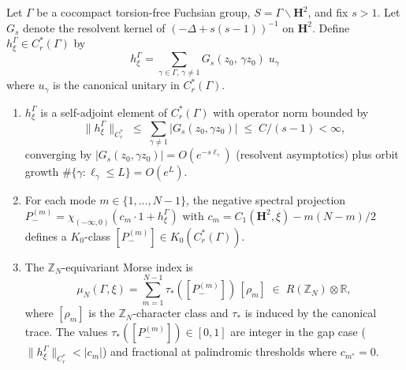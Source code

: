 \begin{theorem}
\label{thm:kk-product}
Let $\Gamma$ be a cocompact torsion-free Fuchsian group,
$S = \Gamma\backslash\mathbf{H}^2$, and fix $s > 1$.
Let $G_s$ denote the resolvent kernel of
$(-\Delta + s(s{-}1))^{-1}$ on $\mathbf{H}^2$.
Define $h_\xi^\Gamma \in C^*_r(\Gamma)$ by
\begin{equation}\label{eq:h-element}
  h_\xi^\Gamma
  = \sum_{\gamma \in \Gamma,\, \gamma \ne 1}
    G_s(z_0,\, \gamma z_0)\; u_\gamma
\end{equation}
where $u_\gamma$ is the canonical unitary in $C^*_r(\Gamma)$.
\begin{enumerate}
  \item $h_\xi^\Gamma$ is a self-adjoint element of
    $C^*_r(\Gamma)$ with operator norm bounded by
    \begin{equation}\label{eq:op-norm-bound}
      \|h_\xi^\Gamma\|_{C^*_r}
      \;\le\; \sum_{\gamma \ne 1} |G_s(z_0, \gamma z_0)|
      \;\le\; C/(s{-}1) < \infty,
    \end{equation}
    converging by $|G_s(z_0,\gamma z_0)| = O(e^{-s\ell_\gamma})$
    (resolvent asymptotics) plus orbit growth
    $\#\{\gamma : \ell_\gamma \le L\} = O(e^L)$.
  \item For each mode $m \in \{1, \ldots, N{-}1\}$, the
    negative spectral projection
    $P_-^{(m)} = \chi_{(-\infty,0)}(c_m \cdot 1 + h_\xi^\Gamma)$
    with $c_m = C_1(\mathbf{H}^2,\xi) - m(N{-}m)/2$
    defines a $K_0$-class
    $[P_-^{(m)}] \in K_0(C^*_r(\Gamma))$.
  \item The $\mathbb{Z}_N$-equivariant Morse index is
    \begin{equation}\label{eq:kasparov-product}
      \mu_N(\Gamma,\xi)
      = \sum_{m=1}^{N-1} \tau_*([P_-^{(m)}])\,[\rho_m]
      \;\in\; R(\mathbb{Z}_N) \otimes \mathbb{R},
    \end{equation}
    where $[\rho_m]$ is the $\mathbb{Z}_N$-character
    class and $\tau_*$ is induced by the canonical trace.
    The values $\tau_*([P_-^{(m)}]) \in [0,1]$ are
    integer in the gap case
    ($\|h_\xi^\Gamma\|_{C^*_r} < |c_m|$) and fractional
    at palindromic thresholds where $c_{m^*} = 0$.
\end{enumerate}
\end{theorem}

